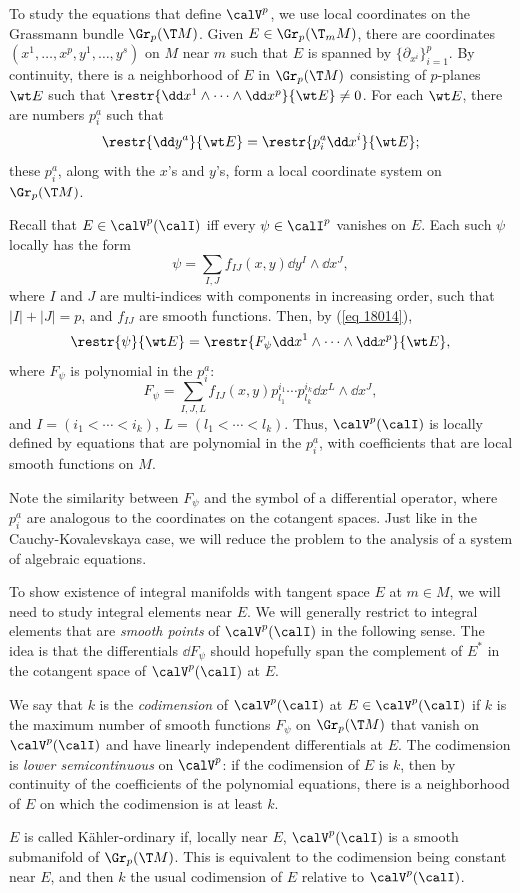 To study the equations that define $\calV^p$, we use local coordinates on the Grassmann bundle $\Gr_p(\T M)$. Given $E\in\Gr_p(\T_m M)$, there are coordinates $(x^1,\ldots,x^p,y^1,\ldots,y^s)$ on $M$ near $m$ such that $E$ is spanned by $\{\partial_{x^i}\}_{i=1}^p$. By continuity, there is a neighborhood of $E$ in $\Gr_p(\T M)$ consisting of $p$-planes $\wt E$ such that $\restr{\dd x^1\wedge \cdots\wedge\dd x^p}{\wt E}\neq 0$. For each $\wt E$, there are numbers $p^a_i$ such that 
\[\restr{\dd y^a}{\wt E}=\restr{p^a_i \dd x^i}{\wt E};\label{eq 18014}\] these $p^a_i$, along with the $x$'s and $y$'s, form a local coordinate system on $\Gr_p(\T M)$.

Recall that $E\in\calV^p(\calI)$ iff every $\psi\in\calI^p$ vanishes on $E$. Each such $\psi$ locally has the form 
\[\psi=\sum_{I,J}f_{IJ}(x,y)\dd y^I\wedge \dd x^J,\]
where $I$ and $J$ are multi-indices with components in increasing order, such that $|I|+|J|=p$, and $f_{IJ}$ are smooth functions. Then, by (\ref{eq 18014}), 
\[\restr{\psi}{\wt E}=\restr{F_\psi \dd x^1\wedge\cdots \wedge\dd x^p}{\wt E},\] 
where $F_\psi$ is polynomial in the $p^a_i$:
\[F_\psi=\sum_{I,J,L}f_{IJ}(x,y)p^{i_1}_{l_1}\cdots p^{i_k}_{l_k}\dd x^L\wedge \dd x^J,\]
and $I=(i_1<\cdots<i_k)$, $L=(l_1<\cdots<l_k)$. Thus, $\calV^p(\calI)$ is locally defined by equations that are polynomial in the $p^a_i$, with coefficients that are local smooth functions on $M$. 

Note the similarity between $F_\psi$ and the symbol of a differential operator, where $p^a_i$ are analogous to the coordinates on the cotangent spaces. Just like in the Cauchy-Kovalevskaya case, we will reduce the problem to the analysis of a system of algebraic equations.

To show existence of integral manifolds with tangent space $E$ at $m\in M$, we will need to study integral elements near $E$. We will generally restrict to integral elements that are \emph{smooth points} of $\calV^p(\calI)$ in the following sense. The idea is that the differentials $\dd F_\psi$ should hopefully span the complement of $E^\ast$ in the cotangent space of $\calV^p(\calI)$ at $E$.

\begin{defn}
    We say that $k$ is the \emph{codimension} of $\calV^p(\calI)$ at $E\in \calV^p(\calI)$ if $k$ is the maximum number of smooth functions $F_\psi$ on $\Gr_p(\T M)$ that vanish on $\calV^p(\calI)$ and have linearly independent differentials at $E$. The codimension is \emph{lower semicontinuous} on $\calV^p$: if the codimension of $E$ is $k$, then by continuity of the coefficients of the polynomial equations, there is a neighborhood of $E$ on which the codimension is at least $k$.

    $E$ is called K\"ahler-ordinary if, locally near $E$, $\calV^p(\calI)$ is a smooth submanifold of $\Gr_p(\T M)$. This is equivalent to the codimension being constant near $E$, and then $k$ the usual codimension of $E$ relative to $\calV^p(\calI)$.
\end{defn}

